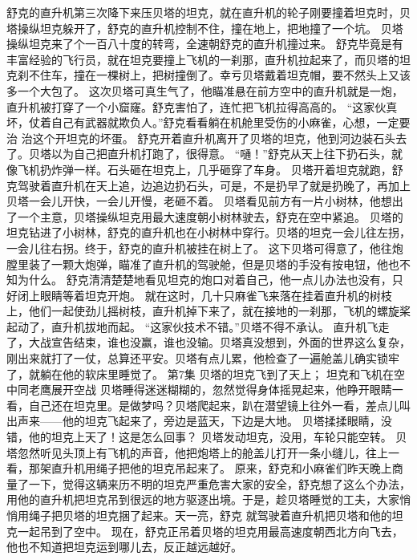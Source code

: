 \documentclass[a4paper,12pt,UTF8,twoside]{ctexbook}
\begin{document}
        舒克的直升机第三次降下来压贝塔的坦克，就在直升机的轮子刚要撞着坦克时，贝塔操纵坦克躲开了，舒克的直升机控制不住，撞在地上，把地撞了一个坑。 
        贝塔操纵坦克来了个一百八十度的转弯，全速朝舒克的直升机撞过来。 
        舒克毕竟是有丰富经验的飞行员，就在坦克要撞上飞机的一刹那，直升机拉起来了，而贝塔的坦克刹不住车，撞在一棵树上，把树撞倒了。幸亏贝塔戴着坦克帽，要不然头上又该多一个大包了。 
        这次贝塔可真生气了，他瞄准悬在前方空中的直升机就是一炮，直升机被打穿了一个小窟窿。舒克害怕了，连忙把飞机拉得高高的。 
        “这家伙真坏，仗着自己有武器就欺负人。”舒克看看躺在机舱里受伤的小麻雀，心想，一定要治 治这个开坦克的坏蛋。 
        舒克开着直升机离开了贝塔的坦克，他到河边装石头去了。贝塔以为自己把直升机打跑了，很得意。 
        “嗵！”舒克从天上往下扔石头，就像飞机扔炸弹一样。石头砸在坦克上，几乎砸穿了车身。 
        贝塔开着坦克就跑，舒克驾驶着直升机在天上追，边追边扔石头，可是，不是扔早了就是扔晚了，再加上贝塔一会儿开快，一会儿开慢，老砸不着。 
        贝塔看见前方有一片小树林，他想出了一个主意，贝塔操纵坦克用最大速度朝小树林驶去，舒克在空中紧追。 
        贝塔的坦克钻进了小树林，舒克的直升机也在小树林中穿行。贝塔的坦克一会儿往左拐，一会儿往右拐。终于，舒克的直升机被挂在树上了。 
        这下贝塔可得意了，他往炮膛里装了一颗大炮弹，瞄准了直升机的驾驶舱，但是贝塔的手没有按电钮，他也不知为什么。 
        舒克清清楚楚地看见坦克的炮口对着自己，他一点儿办法也没有，只好闭上眼睛等着坦克开炮。 
        就在这时，几十只麻雀飞来落在挂着直升机的树枝上，他们一起使劲儿摇树枝，直升机掉下来了，就在接地的一刹那，飞机的螺旋桨起动了，直升机拔地而起。 
        “这家伙技术不错。”贝塔不得不承认。 
        直升机飞走了，大战宣告结束，谁也没赢，谁也没输。贝塔真没想到，外面的世界这么复杂，刚出来就打了一仗，总算还平安。贝塔有点儿累，他检查了一遍舱盖儿确实锁牢了，就躺在他的软床里睡觉了。   第7集 
        贝塔的坦克飞到了天上； 
        坦克和飞机在空中同老鹰展开空战   
        贝塔睡得迷迷糊糊的，忽然觉得身体摇晃起来，他睁开眼睛一看，自己还在坦克里。是做梦吗？贝塔爬起来，趴在潜望镜上往外一看，差点儿叫出声来——他的坦克飞起来了，旁边是蓝天，下边是大地。 
        贝塔揉揉眼睛，没错，他的坦克上天了！这是怎么回事？ 
        贝塔发动坦克，没用，车轮只能空转。 
        贝塔忽然听见头顶上有飞机的声音，他把炮塔上的舱盖儿打开一条小缝儿，往上一看，那架直升机用绳子把他的坦克吊起来了。 
        原来，舒克和小麻雀们昨天晚上商量了一下，觉得这辆来历不明的坦克严重危害大家的安全，舒克想了这么个办法，用他的直升机把坦克吊到很远的地方驱逐出境。于是，趁贝塔睡觉的工夫，大家悄悄用绳子把贝塔的坦克捆了起来。天一亮，舒克 就驾驶着直升机把贝塔和他的坦克一起吊到了空中。 
        现在，舒克正吊着贝塔的坦克用最高速度朝西北方向飞去，他也不知道把坦克运到哪儿去，反正越远越好。 
\end{document}
